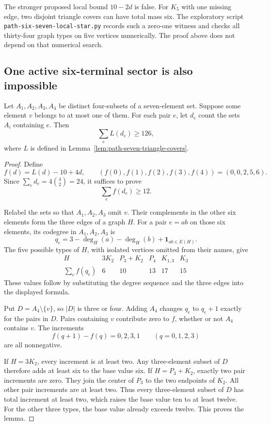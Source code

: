 The stronger proposed local bound $10-2d$ is false.
For $K_5$ with one missing edge, two disjoint triangle covers can have total mass six.
The exploratory script \texttt{path-six-seven-local-star.py} records such a zero-one witness and checks all thirty-four graph types on five vertices numerically.
The proof above does not depend on that numerical search.

\subsection{One active six-terminal sector is also impossible}

\begin{lemma}
\label{lem:path-seven-four-missing-cost}
Let $A_1,A_2,A_3,A_4$ be distinct four-subsets of a seven-element set.
Suppose some element $v$ belongs to at most one of them.
For each pair $e$, let $d_e$ count the sets $A_i$ containing $e$.
Then
\[
 \sum_e L(d_e)\ge126,
\]
where $L$ is defined in Lemma~\ref{lem:path-seven-triangle-covers}.
\end{lemma}

\begin{proof}
Define
\[
 f(d)=L(d)-10+4d,
 \qquad (f(0),f(1),f(2),f(3),f(4))=(0,0,2,5,6).
\]
Since $\sum_e d_e=4\binom42=24$, it suffices to prove
\[
 \sum_e f(d_e)\ge12.
\]

Relabel the sets so that $A_1,A_2,A_3$ omit $v$.
Their complements in the other six elements form the three edges of a graph $H$.
For a pair $e=ab$ on those six elements, its codegree in $A_1,A_2,A_3$ is
\[
 q_e=3-\deg_H(a)-\deg_H(b)+\mathbf1_{ab\in E(H)}.
\]
The five possible types of $H$, with isolated vertices omitted from their names, give
\[
\begin{array}{c|ccccc}
 H&3K_2&P_3+K_2&P_4&K_{1,3}&K_3\\\hline
 \sum_e f(q_e)&6&10&13&17&15
\end{array}
\]
These values follow by substituting the degree sequence and the three edges into the displayed formula.

Put $D=A_4\setminus\{v\}$, so $|D|$ is three or four.
Adding $A_4$ changes $q_e$ to $q_e+1$ exactly for the pairs in $D$.
Pairs containing $v$ contribute zero to $f$, whether or not $A_4$ contains $v$.
The increments
\[
 f(q+1)-f(q)=0,2,3,1\qquad(q=0,1,2,3)
\]
are all nonnegative.

If $H=3K_2$, every increment is at least two.
Any three-element subset of $D$ therefore adds at least six to the base value six.
If $H=P_3+K_2$, exactly two pair increments are zero.
They join the center of $P_3$ to the two endpoints of $K_2$.
All other pair increments are at least two.
Thus every three-element subset of $D$ has total increment at least two, which raises the base value ten to at least twelve.
For the other three types, the base value already exceeds twelve.
This proves the lemma.
\end{proof}

